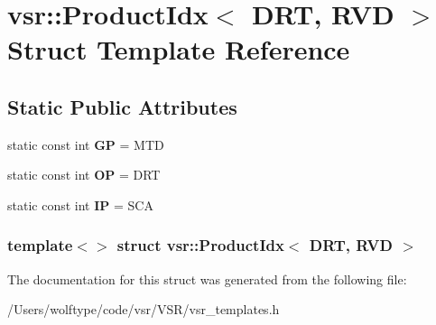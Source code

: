 \hypertarget{structvsr_1_1_product_idx_3_01_d_r_t_00_01_r_v_d_01_4}{\section{vsr\-:\-:Product\-Idx$<$ D\-R\-T, R\-V\-D $>$ Struct Template Reference}
\label{structvsr_1_1_product_idx_3_01_d_r_t_00_01_r_v_d_01_4}
}
\subsection*{Static Public Attributes}
\begin{DoxyCompactItemize}
\item 
\hypertarget{structvsr_1_1_product_idx_3_01_d_r_t_00_01_r_v_d_01_4_a8109a6fabad90b6f0801e81f4eccfddc}{static const int {\bfseries G\-P} = M\-T\-D}\label{structvsr_1_1_product_idx_3_01_d_r_t_00_01_r_v_d_01_4_a8109a6fabad90b6f0801e81f4eccfddc}

\item 
\hypertarget{structvsr_1_1_product_idx_3_01_d_r_t_00_01_r_v_d_01_4_a7a229bd22e8c4695a513cd091da6b644}{static const int {\bfseries O\-P} = D\-R\-T}\label{structvsr_1_1_product_idx_3_01_d_r_t_00_01_r_v_d_01_4_a7a229bd22e8c4695a513cd091da6b644}

\item 
\hypertarget{structvsr_1_1_product_idx_3_01_d_r_t_00_01_r_v_d_01_4_a963aea2b799b09d78aaa3058732b17f6}{static const int {\bfseries I\-P} = S\-C\-A}\label{structvsr_1_1_product_idx_3_01_d_r_t_00_01_r_v_d_01_4_a963aea2b799b09d78aaa3058732b17f6}

\end{DoxyCompactItemize}
\subsubsection*{template$<$$>$ struct vsr\-::\-Product\-Idx$<$ D\-R\-T, R\-V\-D $>$}



The documentation for this struct was generated from the following file\-:\begin{DoxyCompactItemize}
\item 
/\-Users/wolftype/code/vsr/\-V\-S\-R/vsr\-\_\-templates.\-h\end{DoxyCompactItemize}
